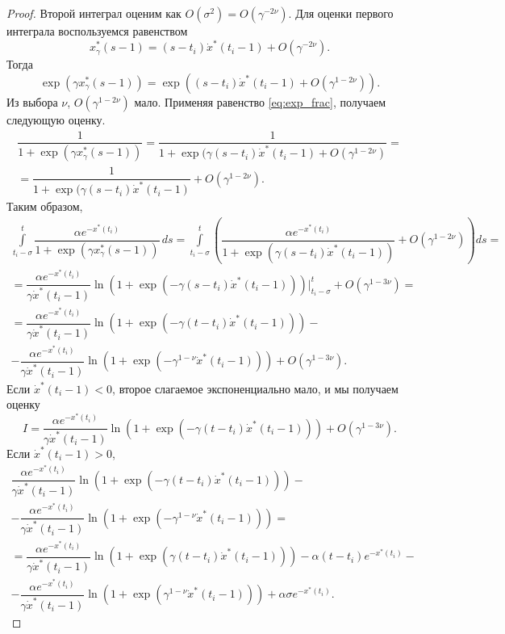 \begin{proof}
	Второй интеграл оценим как $O(\sigma^2) = O(\gamma^{-2\nu})$. Для оценки первого интеграла воспользуемся равенством
	\[
	x^*_{\gamma}(s - 1) = (s - t_i)\dot{x}^*(t_i - 1) + O(\gamma^{-2\nu}).
	\]
	Тогда 
	\[
	\exp(\gamma x^*_{\gamma}(s - 1)) = \exp((s - t_i)\dot{x}^*(t_i - 1) + O(\gamma^{1 - 2\nu})).
	\]
	Из выбора $\nu$, $O(\gamma^{1 - 2\nu})$ мало. Применяя равенство \eqref{eq:exp_frac}, получаем следующую оценку.
	\begin{multline*}
	\dfrac{1}{1 + \exp(\gamma x^*_{\gamma}(s - 1))} = \dfrac{1}{1 + \exp(\gamma (s - t_i) \dot{x}^*(t_i - 1) + O(\gamma^{1 - 2\nu})} =\\= \dfrac{1}{1 + \exp(\gamma(s - t_i)\dot{x}^*(t_i - 1)} + O(\gamma^{1 - 2\nu}).
	\end{multline*}
	Таким образом,
	\begin{multline*}
	\int\limits_{t_i - \sigma}^{t} \dfrac{\alpha e^{-x^*(t_i)}}{1 + \exp(\gamma x^*_{\gamma}(s - 1))}\, ds = \int\limits_{t_i - \sigma}^{t} \left(\dfrac{\alpha e^{-x^*(t_i)}}{1 + \exp(\gamma(s - t_i)\dot{x}^*(t_i - 1))} + O(\gamma^{1 - 2\nu})\right) ds =\\
	= \dfrac{\alpha e^{-x^*(t_i)}}{\gamma \dot{x}^*(t_i - 1)}\ln\left(1 + \exp(-\gamma(s - t_i)\dot{x}^*(t_i - 1))\right)\bigg\vert_{t_i - \sigma}^t + O(\gamma^{1 - 3\nu}) = \\
	= \dfrac{\alpha e^{-x^*(t_i)}}{\gamma \dot{x}^*(t_i - 1)}\ln\left(1 + \exp(-\gamma(t - t_i)\dot{x}^*(t_i - 1))\right) -\\- \dfrac{\alpha e^{-x^*(t_i)}}{\gamma \dot{x}^*(t_i - 1)}\ln\left(1 + \exp(-\gamma^{1 - \nu}\dot{x}^*(t_i - 1))\right) + O(\gamma^{1 - 3\nu}).
	\end{multline*}
	Если $\dot{x}^*(t_i - 1) < 0$, второе слагаемое экспоненциально мало, и мы получаем оценку 
	\begin{equation}
	\label{eq:I_estimate_dotx_less_0}
	I = \dfrac{\alpha e^{-x^*(t_i)}}{\gamma \dot{x}^*(t_i - 1)}\ln\left(1 + \exp(-\gamma(t - t_i)\dot{x}^*(t_i - 1))\right) + O(\gamma^{1 - 3\nu}).
	\end{equation}
	Если $\dot{x}^*(t_i - 1) > 0$, 
	\begin{multline}
	\dfrac{\alpha e^{-x^*(t_i)}}{\gamma \dot{x}^*(t_i - 1)}\ln\left(1 + \exp(-\gamma(t - t_i)\dot{x}^*(t_i - 1))\right) -\\- \dfrac{\alpha e^{-x^*(t_i)}}{\gamma \dot{x}^*(t_i - 1)}\ln\left(1 + \exp(-\gamma^{1 - \nu}\dot{x}^*(t_i - 1))\right) =\\
	= \dfrac{\alpha e^{-x^*(t_i)}}{\gamma \dot{x}^*(t_i - 1)}\ln\left(1 + \exp(\gamma(t - t_i)\dot{x}^*(t_i - 1))\right) - \alpha (t - t_i) e^{-x^*(t_i)} -\\- \dfrac{\alpha e^{-x^*(t_i)}}{\gamma \dot{x}^*(t_i - 1)}\ln\left(1 + \exp(\gamma^{1 - \nu}\dot{x}^*(t_i - 1))\right) + \alpha \sigma e^{-x^*(t_i)}. 

\end{multline}
\end{proof}
